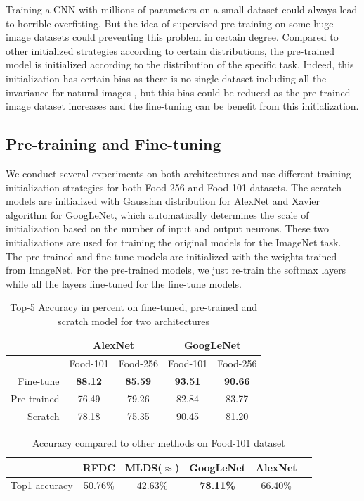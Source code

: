 ﻿Training a CNN with millions of parameters on a small dataset could always lead to horrible overfitting. But the idea of supervised pre-training on some huge image datasets could preventing this problem in certain degree. Compared to other initialized strategies according to certain distributions, the pre-trained model is initialized according to the distribution of the specific task. Indeed, this initialization has certain bias as there is no single dataset including all the invariance for natural images \cite{agrawal2014analyzing}, but this bias could be reduced as the pre-trained image dataset increases and the fine-tuning can be benefit from this initialization.
\subsection{Pre-training and Fine-tuning}
We conduct several experiments on both architectures and use different training initialization strategies for both Food-256 and Food-101 datasets. The scratch models are initialized with Gaussian distribution for AlexNet and Xavier algorithm \cite{glorot2010understanding} for GoogLeNet, which automatically determines the scale of initialization based on the number of input and output neurons. These two initializations are used for training the original models for the ImageNet task. The pre-trained and fine-tune models are initialized with the weights trained from ImageNet. For the pre-trained models, we just re-train the softmax layers while all the layers fine-tuned for the fine-tune models.
\begin{table}[htbp]
  \centering
  \caption{Top-5 Accuracy in percent on fine-tuned, pre-trained and scratch model for two architectures}
    \begin{tabular}{r|cc|cc}
    \toprule
          & \multicolumn{2}{c|}{AlexNet} & \multicolumn{2}{c}{GoogLeNet} \\    \midrule
     & Food-101   & Food-256   & Food-101   & Food-256 \\
    Fine-tune & \textbf{88.12} & \textbf{85.59} & \textbf{93.51} & \textbf{90.66} \\
    Pre-trained &76.49	&79.26&	82.84	&83.77\\
    Scratch & 78.18 & 75.35 & 90.45 & 81.20 \\
    \bottomrule
    \end{tabular}%
  \label{tab:ft}%
\end{table}%

\begin{table}[htbp]
  \centering
  \caption{Accuracy compared to other methods on Food-101 dataset}
    \begin{tabular}{c|ccccc}
    \toprule
          & RFDC\cite{bossard14} & MLDS($\approx$\cite{singh2012unsupervised}) & GoogLeNet & AlexNet \\
    \midrule
    Top1 accuracy & 50.76\% & 42.63\%& \textbf{78.11\% }& 66.40\% \\
    \bottomrule
    \end{tabular}%
    \label{tab:pre}
\end{table}%



